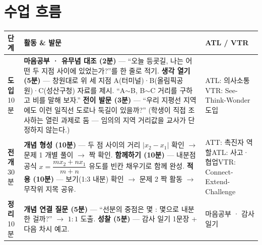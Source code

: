 \documentclass[11pt,a4paper]{article}
\begin{document}
\section{수업 흐름}

\begin{tabularx}{\linewidth}{@{}>{\centering\arraybackslash}p{1.6cm}X>{\raggedright\arraybackslash\small}p{3.1cm}@{}}
\toprule
\textbf{단계} & \textbf{활동 \& 발문} & \textbf{ATL / VTR} \\
\midrule
\textcolor{goldstrong}{\textbf{도입}}\newline\footnotesize 10분 &
\textbf{마음공부 · 유무념 대조 (2분)} --- ``오늘 등굣길, 나는 어떤 두 지점 사이에 있었는가?''를 한 줄로 적기.\newline
\textbf{생각 열기 (5분)} --- 창원대로 위 세 지점 A(터미널)·B(올림픽공원)·C(성산구청) 자료를 제시. ``A$\sim$B, B$\sim$C 거리를 구하고 비를 말해 보자.''\newline
\textbf{전이 발문 (3분)} --- ``우리 지평선 지역에도 이런 일직선 도로나 둑길이 있을까?'' (학생이 직접 조사하는 열린 과제로 둠 --- 임의의 지역 거리값을 교사가 단정하지 않는다.) &
ATL: 의사소통\newline VTR: See-Think-Wonder 도입 \\
\addlinespace
\textcolor{goldstrong}{\textbf{전개}}\newline\footnotesize 30분 &
\textbf{개념 형성 (10분)} --- 두 점 사이의 거리 $|x_2-x_1|$ 확인 $\to$ 문제 1 개별 풀이 $\to$ 짝 확인.\newline
\textbf{함께하기 (10분)} --- 내분점 공식 $x=\dfrac{mx_2+nx_1}{m+n}$ 유도를 빈칸 채우기로 함께 완성.\newline
\textbf{적용 (10분)} --- 보기(1:3 내분) 확인 $\to$ 문제 2 짝 활동 $\to$ 무작위 지목 공유. &
ATT: 촉진자 역할\newline ATL: 사고·협업\newline VTR: Connect-Extend-Challenge \\
\addlinespace
\textcolor{goldstrong}{\textbf{정리}}\newline\footnotesize 10분 &
\textbf{개념 연결 질문 (5분)} --- ``선분의 중점은 몇 : 몇으로 내분한 걸까?'' $\to$ $1:1$ 도출.\newline
\textbf{성찰 (5분)} --- 감사 일기 1문장 + 다음 차시 예고. &
마음공부 · 감사 일기 \\
\bottomrule
\end{tabularx}
\end{document}

